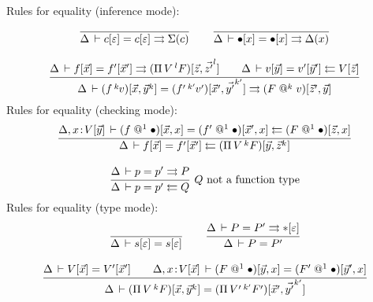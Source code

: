 \documentclass[a4paper]{article}
\makeatletter
\newcommand{\oann}[1]{{}^{#1}\kern-0.15ex}
\newcommand{\ovar}{\mathord{\bullet}}
\newcommand{\oapp}[1]{\,\oann{#1}}
\newcommand{\opi}[2]{\Pi\,#1\,^{#2}}
\renewcommand{\sempty}{\varepsilon}
\newcommand{\oclos}[2]{#1[#2]}
\newcommand{\oclosp}[2]{(#1)[#2]}
\newcommand{\vapp}[1]{\mathrel{@^{#1}}}
\makeatother
\begin{document}
Rules for equality (inference mode):
\begin{gather*}
  \ru{}{\Delta \der \oclos c \sempty = \oclos c \sempty \jinf \Sigma(c)} 
\qquad
  \ru{}{\Delta \der \oclos \ovar x = \oclos \ovar x \jinf \Delta(x)}
\\[2ex]
  \ru{\Delta \der \oclos f {\vec x} = \oclos {f'}{\vec x'} \jinf 
        \oclosp{\opi V l F}{\vec z,{\vec {z'}}^l} \qquad
      \Delta \der \oclos v {\vec y} = \oclos {v'}{\vec y'} \jchk
        \oclos V {\vec z}
    }{\Delta \der \oclosp {f \oapp k v}{\vec x,\vec y^k} 
                = \oclosp {f' \oapp {k'} v'}{\vec x',{\vec {y'}}^{k'}}
                \jinf \oclosp{F \vapp{k} v}{\vec z',\vec y}
    } 
\end{gather*}
Rules for equality (checking mode):
\begin{gather*}
  \ru{\Delta, x \of \oclos V {\vec y} \der 
        \oclosp {f  \vapp 1 \ovar}{\vec x ,x} = 
        \oclosp {f' \vapp 1 \ovar}{\vec x',x}  \jchk 
        \oclosp {F  \vapp 1 \ovar}{\vec z, x} 
    }{\Delta \der \oclos f {\vec x} = \oclos {f'} {\vec x'}
          \jchk \oclosp {\opi V k F}{\vec y,\vec z^k}} 
\\[2ex]
  \rux{\Delta \der p = p' \jinf P
     }{\Delta \der p = p' \jchk Q
     }{Q \mbox{ not a function type}} 
\end{gather*}
Rules for equality (type mode):
\begin{gather*}
  \ru{}{\Delta \der \oclos s \sempty = \oclos s \sempty} 
\qquad
  \ru{\Delta \der P = P' \jinf \oclos \ttype \sempty
    }{\Delta \der P = P'}
\\[2ex]
  \ru{\Delta \der \oclos V {\vec x} = \oclos {V'}{\vec x'} \qquad
      \Delta, x\of\oclos V {\vec x} \der 
         \oclosp{F  \vapp 1 \ovar}{\vec y,x} =
         \oclosp{F' \vapp 1 \ovar}{\vec y',x} 
    }{\Delta \der \oclosp {\opi {V }{k }{F }}{\vec x ,\vec y^k}
               =  \oclosp {\opi {V'}{k'}{F'}}{\vec x',\vec {y'}^{k'}}
    }
\end{gather*}
\end{document}
